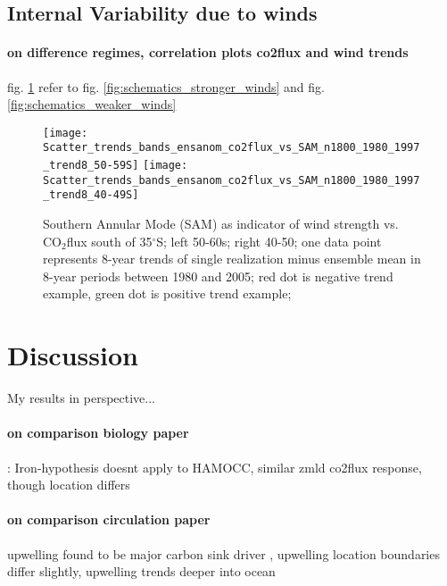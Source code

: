 \documentclass[12pt]{article}
\begin{document}
\clearpage

\subsection{Internal Variability due to winds}

\paragraph{on difference regimes, correlation plots co2flux and wind trends} fig. \ref{fig:scatter} refer to fig. \ref{fig:schematics_stronger_winds} and fig. \ref{fig:schematics_weaker_winds}

\begin{figure}[h!]
		\texttt{[image: Scatter\_trends\_bands\_ensanom\_co2flux\_vs\_SAM\_n1800\_1980\_1997\_trend8\_50-59S]}
		\texttt{[image: Scatter\_trends\_bands\_ensanom\_co2flux\_vs\_SAM\_n1800\_1980\_1997\_trend8\_40-49S]}
		\vspace{-2mm}
		\caption{Southern Annular Mode (SAM) as indicator of wind strength vs. CO$_2$flux south of 35$^\circ$S; left 50-60s; right 40-50; one data point represents 8-year trends of single realization minus ensemble mean in 8-year periods between 1980 and 2005; red dot is negative trend example, green dot is positive trend example; }
		\label{fig:scatter}
\end{figure}



\clearpage

\section{Discussion}

My results in perspective...

\paragraph{on comparison biology paper}: Iron-hypothesis \citep{Martin1990} doesnt apply to HAMOCC, similar zmld co2flux response, though location differs \citep{Lovenduski2005,Hauck2013,wang2012} 

\paragraph{on comparison circulation paper} upwelling found to be major carbon sink driver \citep{landschuetzer2015,LeQuere2007,Lovenduski2007}, upwelling location boundaries differ slightly, upwelling trends deeper into ocean \citep{DeVries2017}
\end{document}
